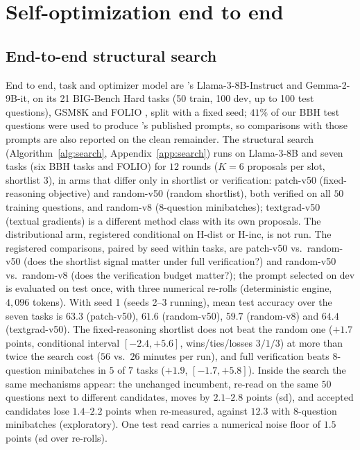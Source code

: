 \section{Self-optimization end to end}
\label{sec:experiments}

\subsection{End-to-end structural search}
\label{sec:exp-search}
End to end, task and optimizer model are \greater{}'s Llama-3-8B-Instruct and Gemma-2-9B-it, on its
21 BIG-Bench Hard tasks \citep{suzgun2023bbh} (50 train, 100 dev, up to 100 test questions), GSM8K
\citep{cobbe2021gsm8k} and FOLIO \citep{han2024folio}, split with a fixed seed; $41\%$ of our BBH
test questions were used to produce \greater{}'s published prompts, so comparisons with those prompts
are also reported on the clean remainder. The structural search (Algorithm~\ref{alg:search},
Appendix~\ref{app:search}) runs on Llama-3-8B and seven tasks (six BBH tasks and FOLIO) for $12$
rounds ($K=6$ proposals per slot, shortlist $3$), in arms that differ only in shortlist or
verification: patch-v50 (fixed-reasoning objective) and random-v50 (random shortlist), both verified
on all $50$ training questions, and random-v8 ($8$-question minibatches); textgrad-v50 (textual
gradients) is a different method class with its own proposals. The distributional
arm, registered conditional on H-dist or H-inc, is not run. The registered comparisons, paired by
seed within tasks, are patch-v50 vs.\ random-v50 (does the shortlist signal matter under full verification?) and
random-v50 vs.\ random-v8 (does the verification budget matter?); the prompt selected on dev is
evaluated on test once, with three numerical re-rolls (deterministic engine, $4{,}096$ tokens).
With seed 1 (seeds 2--3 running), mean test accuracy over the seven tasks is $63.3$ (patch-v50),
$61.6$ (random-v50), $59.7$ (random-v8) and $64.4$ (textgrad-v50). The fixed-reasoning shortlist does
not beat the random one ($+1.7$ points, conditional interval $[-2.4,+5.6]$, wins/ties/losses $3/1/3$)
at more than twice the search cost ($56$ vs.\ $26$ minutes per run), and full verification beats
$8$-question minibatches in $5$ of $7$ tasks ($+1.9$, $[-1.7,+5.8]$). Inside the search the same
mechanisms appear: the unchanged incumbent, re-read on the same $50$ questions next to different
candidates, moves by $2.1$--$2.8$ points (sd), and accepted candidates lose $1.4$--$2.2$ points when
re-measured, against $12.3$ with $8$-question minibatches (exploratory). One test read carries a
numerical noise floor of $1.5$ points (sd over re-rolls). 

